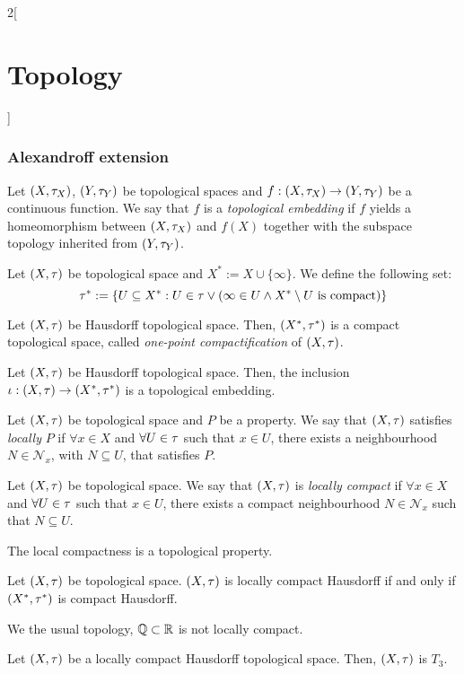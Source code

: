 \documentclass[../../../main.tex]{subfiles}
\begin{document}
\begin{multicols}{2}[\section{Topology}]
    \subsubsection{Alexandroff extension}
    \begin{definition}
        Let $(X,\tau_X)$, $(Y,\tau_Y)$ be topological spaces and $f:(X,\tau_X)\rightarrow(Y,\tau_Y)$ be a continuous function. We say that $f$ is a \emph{topological embedding} if $f$ yields a homeomorphism between $(X,\tau_X)$ and $f(X)$ together with the subspace topology inherited from $(Y,\tau_Y)$.
    \end{definition}
    \begin{definition}
        Let $(X,\tau)$ be topological space and $X^*:=X\cup\{\infty\}$. We define the following set:
        $$\tau^*:=\{U\subseteq X^*:U\in\tau\lor(\infty\in U\land X^*\setminus U\text{ is compact})\}$$
    \end{definition}
    \begin{theorem}
        Let $(X,\tau)$ be Hausdorff topological space. Then, $(X^*,\tau^*)$ is a compact topological space, called \emph{one-point compactification} of $(X,\tau)$.
    \end{theorem}
    \begin{prop}
        Let $(X,\tau)$ be Hausdorff topological space. Then, the inclusion $\iota: (X,\tau)\rightarrow(X^*,\tau^*)$ is a topological embedding.
    \end{prop}
    \begin{definition}
        Let $(X,\tau)$ be topological space and $P$ be a property. We say that $(X,\tau)$ satisfies \emph{locally} $P$ if $\forall x\in X$ and $\forall U\in\tau$ such that $x\in U$, there exists a neighbourhood $N\in\mathcal{N}_x$, with $N\subseteq U$, that satisfies $P$.
    \end{definition}
    \begin{definition}
        Let $(X,\tau)$ be topological space. We say that $(X,\tau)$ is \emph{locally compact} if $\forall x\in X$ and $\forall U\in\tau$ such that $x\in U$, there exists a compact neighbourhood $N\in\mathcal{N}_x$ such that $N\subseteq U$.
    \end{definition}
    \begin{prop}
        The local compactness is a topological property.
    \end{prop}
    \begin{definition}
        Let $(X,\tau)$ be topological space. $(X,\tau)$ is locally compact Hausdorff if and only if $(X^*,\tau^*)$ is compact Hausdorff.
    \end{definition}
    \begin{prop}
        We the usual topology, $\mathbb{Q}\subset \mathbb{R}$ is not locally compact.
    \end{prop}
    \begin{theorem}
        Let $(X,\tau)$ be a locally compact Hausdorff topological space. Then, $(X,\tau)$ is $T_3$.
    \end{theorem}

\end{multicols}
\end{document}
